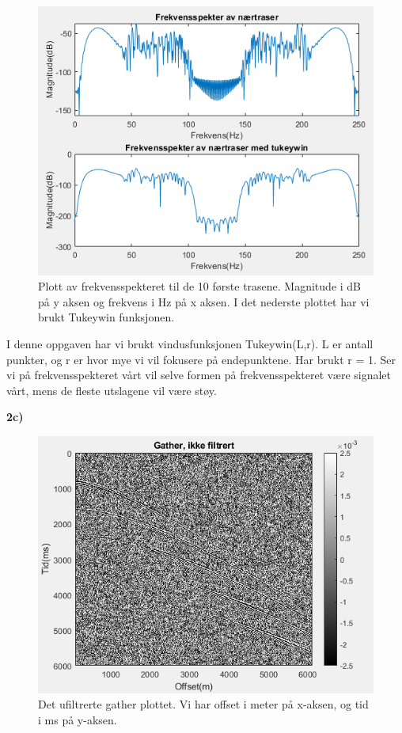 \documentclass[11pt]{article}
\begin{document}
\begin{figure}[H]
\includegraphics[scale=0.67]{2b_nertrasefrek.png}
\caption{Plott av frekvensspekteret til de 10 første trasene. Magnitude i dB på y aksen og frekvens i Hz på x aksen. I det nederste plottet har vi brukt Tukeywin funksjonen.}
\end{figure}

I denne oppgaven har vi brukt vindusfunksjonen Tukeywin(L,r). L er antall punkter, og r er hvor mye vi vil fokusere på endepunktene. Har brukt r = 1. Ser vi på frekvensspekteret vårt vil selve formen på frekvensspekteret være signalet vårt, mens de fleste utslagene vil være støy.

\textbf{2c)}

\begin{figure}[H]
\includegraphics[scale=0.9]{2c_ufiltrert.png}
\caption{Det ufiltrerte gather plottet. Vi har offset i meter på x-aksen, og tid i ms på y-aksen.}
\end{figure}
\end{document}
